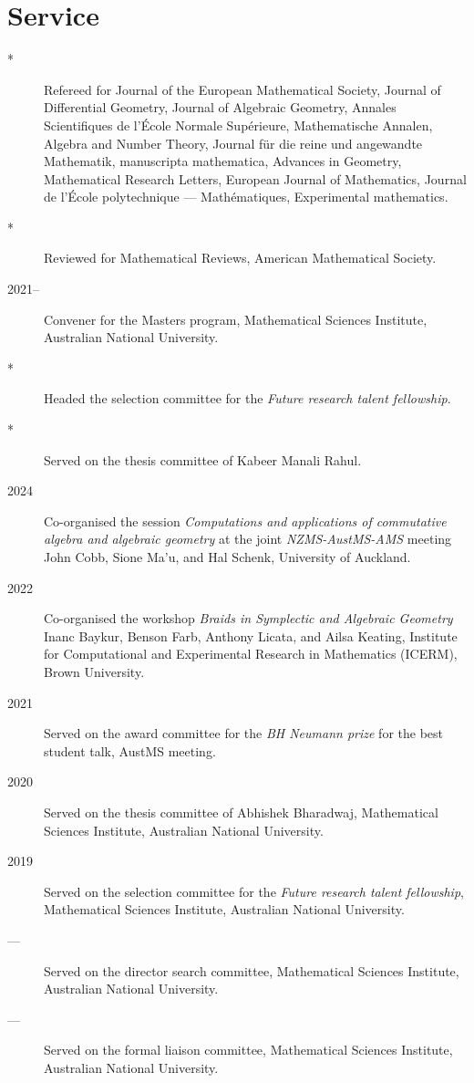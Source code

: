 \documentclass[11pt]{article}
\begin{document}
\section*{Service}
\label{sec:orgd7b8051}
\label{orgb1454cb}
\begin{description}
\item[{*}] Refereed for Journal of the European Mathematical Society, Journal of Differential Geometry, Journal of Algebraic Geometry, Annales Scientifiques de l'École Normale Supérieure, Mathematische Annalen, Algebra and Number Theory, Journal für die reine und angewandte Mathematik, manuscripta mathematica, Advances in Geometry, Mathematical Research Letters, European Journal of Mathematics, Journal de l'École polytechnique — Mathématiques, Experimental mathematics.
\item[{*}] Reviewed for Mathematical Reviews, American Mathematical Society.
\item[{2021--}] Convener for the Masters program, Mathematical Sciences Institute, Australian National University.
\item[{*}] Headed the selection committee for the \emph{Future research talent fellowship}.
\item[{*}] Served on the thesis committee of Kabeer Manali Rahul.
\item[{2024}] Co-organised the session \emph{Computations and applications of commutative algebra and algebraic geometry} at the joint \emph{NZMS-AustMS-AMS} meeting John Cobb, Sione Ma'u, and Hal Schenk, University of Auckland.
\item[{2022}] Co-organised the workshop \emph{Braids in Symplectic and Algebraic Geometry} Inanc Baykur, Benson Farb, Anthony Licata, and Ailsa Keating, Institute for Computational and Experimental Research in Mathematics (ICERM), Brown University.
\item[{2021}] Served on the award committee for the \emph{BH Neumann prize} for the best student talk, AustMS meeting.
\item[{2020}] Served on the thesis committee of Abhishek Bharadwaj, Mathematical Sciences Institute, Australian National University.
\item[{2019}] Served on the selection committee for the \emph{Future research talent fellowship}, Mathematical Sciences Institute, Australian National University.
\item[{---}] Served on the director search committee, Mathematical Sciences Institute, Australian National University.
\item[{---}] Served on the formal liaison committee, Mathematical Sciences Institute, Australian National University.

\end{description}
\end{document}
